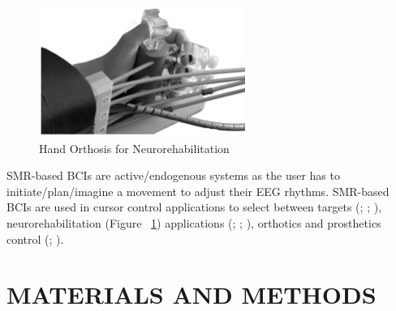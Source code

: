 \documentclass[12pt]{article}
\newcommand\mysection[1]{\vspace*{-0.35cm}\section{#1}\vspace*{6pt}\thispagestyle{empty}}
\numberwithin{equation}{section}
\numberwithin{figure}{section}
\numberwithin{table}{section}
\begin{document}
\par{
    \begin{figure}[ht]
        \centering
        \includegraphics[width=0.6\textwidth]{images/bci_hand_rehab}
        \caption[Hand Orthosis for Neurorehabilitation]{Hand Orthosis for Neurorehabilitation \citep{ramos-murguialday_proprioceptive_2012}}
        \label{fig:motor_orthosis}
    \end{figure}
    SMR-based BCIs are active/endogenous systems as the user has to initiate/plan/imagine
    a movement to adjust their EEG rhythms. SMR-based BCIs are used in cursor control
    applications to select between targets
    (\citealp{wolpaw_eeg-based_1991}; \citealp{wolpaw_wadsworth_2003}; \citealp{vaughan_wadsworth_2006}),
    neurorehabilitation (Figure ~\ref{fig:motor_orthosis}) applications (\citealp{prasad_using_2009}; \citealp{ramos-murguialday_proprioceptive_2012};
    \citealp{ortner_human-computer_2013}), orthotics and prosthetics control (\citealp{guger_prosthetic_1999}; \citealp{pfurtscheller_motor_2001}).
}



\clearpage
\vspace*{-0.35cm}
\mysection{MATERIALS AND METHODS}
\end{document}
